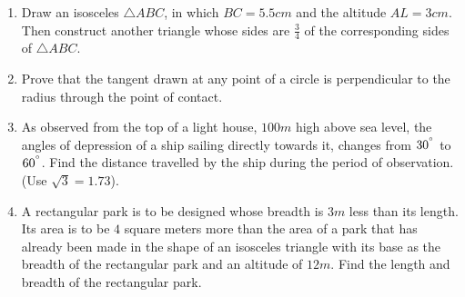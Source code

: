 \documentclass{article}
\begin{document}
\begin{enumerate}
\item Draw an isosceles $\triangle ABC$, in which $BC = 5.5cm$ and the altitude $AL = 3cm$. Then construct another triangle whose sides are $\frac{3}{4}$ of the corresponding sides of $\triangle ABC$.                                                                                             

\item Prove that the tangent drawn at any point of a circle is perpendicular to the radius through the point of contact.                                                                                             

\item As observed from the top of a light house, $100 m$  high above sea level, the angles of depression of a ship sailing directly towards it, changes from $30^{\degree}$ to $60^{\degree}$. Find the distance travelled by the ship during the period of observation. (Use $\sqrt{3} = 1.73$).  

\item A rectangular park is to be designed whose breadth is $3 m$ less than its length. Its area is to be $4$ square meters more than the area of a park that has already been made in the shape of an isosceles triangle with its base as the breadth of the rectangular park and an altitude of $12 m$. Find the length and breadth of the rectangular park.                                                           
\end{enumerate}                                        
\end{document}
